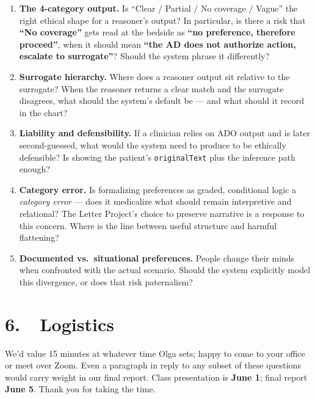 \documentclass[11pt]{article}
\newcommand{\onto}[1]{\texttt{\small #1}}
\begin{document}
\begin{enumerate}
    \item \textbf{The 4-category output.} Is ``Clear / Partial / No coverage / Vague'' the right ethical shape for a reasoner's output? In particular, is there a risk that \textbf{``No coverage''} gets read at the bedside as \textbf{``no preference, therefore proceed''}, when it should mean \textbf{``the AD does not authorize action, escalate to surrogate''}? Should the system phrase it differently?

    \item \textbf{Surrogate hierarchy.} Where does a reasoner output sit relative to the surrogate? When the reasoner returns a clear match and the surrogate disagrees, what should the system's default be --- and what should it record in the chart?

    \item \textbf{Liability and defensibility.} If a clinician relies on ADO output and is later second-guessed, what would the system need to produce to be ethically defensible? Is showing the patient's \onto{originalText} plus the inference path enough?

    \item \textbf{Category error.} Is formalizing preferences as graded, conditional logic a \emph{category error} --- does it medicalize what should remain interpretive and relational? The Letter Project's choice to preserve narrative is a response to this concern. Where is the line between useful structure and harmful flattening?

    \item \textbf{Documented vs.\ situational preferences.} People change their minds when confronted with the actual scenario. Should the system explicitly model this divergence, or does that risk paternalism?
\end{enumerate}

\section*{6.\ \ Logistics}

We'd value 15 minutes at whatever time Olga sets; happy to come to your office or meet over Zoom. Even a paragraph in reply to any subset of these questions would carry weight in our final report. Class presentation is \textbf{June 1}; final report \textbf{June 5}. Thank you for taking the time.
\end{document}

